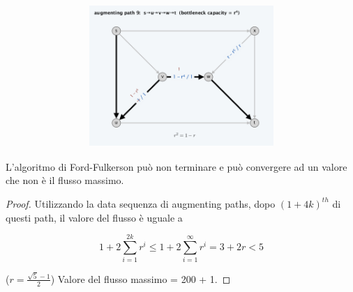 \begin{figure}[H]
\begin{subfigure}{\textwidth}
\begin{subfigure}{.33\textwidth}
			\includegraphics[width=\linewidth]{capitoli/network_flow/imgs/ex9.png}
		\end{subfigure}
	\end{subfigure}
\end{figure}

\begin{myblockquote}
	\begin{minipage}{\textwidth}
		\begin{theorem}
			L'algoritmo di Ford-Fulkerson
			può non terminare e può convergere ad un valore che non è il flusso
			massimo.
		\end{theorem}
	\end{minipage}
\end{myblockquote}

\begin{proof}
	Utilizzando la data sequenza di augmenting
	paths, dopo $(1+4k)^{th}$ di questi path, il valore del flusso è
	uguale a

	$$
		1 + 2 \sum^{2k}_{i=1}r^i \le 1 + 2 \sum^{\infty}_{i=1}r^i = 3 + 2r < 5
	$$

	($r = \frac{\sqrt{5}-1}{2}$) Valore del flusso massimo = 200 + 1.
\end{proof}